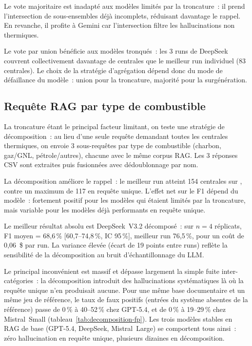 \documentclass[a4paper,11pt]{report}
\begin{document}

Le vote majoritaire est inadapté aux modèles limités par la troncature~: il prend l'intersection de sous-ensembles déjà incomplets, réduisant davantage le rappel. En revanche, il profite à Gemini car l'intersection filtre les hallucinations non thermiques.

Le vote par union bénéficie aux modèles tronqués~: les 3 runs de DeepSeek couvrent collectivement davantage de centrales que le meilleur run individuel (83 centrales). Le choix de la stratégie d'agrégation dépend donc du mode de défaillance du modèle~: union pour la troncature, majorité pour la surgénération.

\subsection{Requête RAG par type de combustible}\label{sec:rag_per_fuel}

La troncature étant le principal facteur limitant, on teste une stratégie de décomposition~: au lieu d'une seule requête demandant toutes les centrales thermiques, on envoie 3 sous-requêtes par type de combustible (charbon, gaz/GNL, pétrole/autres), chacune avec le même corpus RAG. Les 3 réponses CSV sont extraites puis fusionnées avec dédoublonnage par nom.


La décomposition améliore le rappel~: le meilleur run atteint 154 centrales sur \NumRefPlants{}, contre un maximum de 117 en requête unique. L'effet net sur le F1 dépend du modèle~: fortement positif pour les modèles qui étaient limités par la troncature, mais variable pour les modèles déjà performants en requête unique.

Le meilleur résultat absolu est DeepSeek~V3.2 décomposé~: sur $n=4$ réplicats, F1 moyen = 68,6\,\% [60,7--74,8\,\%, IC 95\,\%], meilleur run 76,5\,\%, pour un coût de 0,06~\$ par run. La variance élevée (écart de 19 points entre runs) reflète la sensibilité de la décomposition au bruit d'échantillonnage du LLM.

Le principal inconvénient est massif et dépasse largement la simple fuite inter-catégories~: la décomposition introduit des hallucinations systématiques là où la requête unique n'en produisait aucune. Pour une même base documentaire et un même jeu de référence, le taux de faux positifs (entrées du système absentes de la référence) passe de 0\,\% à 40--52\,\% chez GPT-5.4, et de 0\,\% à 19--29\,\% chez Mistral~Small (tableau~\ref{tab:decomposition-fp}). Les trois modèles stables en RAG de base (GPT-5.4, DeepSeek, Mistral~Large) se comportent tous ainsi~: zéro hallucination en requête unique, plusieurs dizaines en décomposition.
\end{document}
